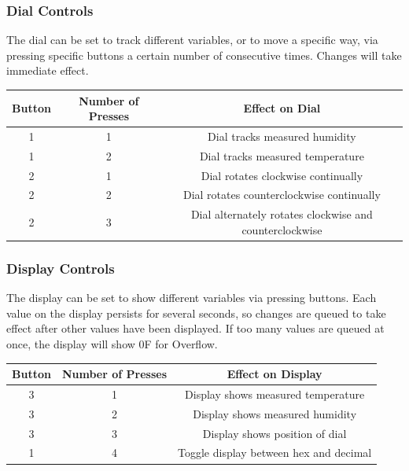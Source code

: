 \documentclass[12pt]{amsart}
\begin{document}
\subsubsection{Dial Controls}

The dial can be set to track different variables, or to move a specific way, via pressing
specific buttons a certain number of consecutive times. Changes will take immediate effect.

\begin{center}
    \begin{tabular}{c|c|c}
        Button & Number of Presses & Effect on Dial \\
        \hline
        1 & 1 & Dial tracks measured humidity \\
        1 & 2 & Dial tracks measured temperature \\
        2 & 1 & Dial rotates clockwise continually \\
        2 & 2 & Dial rotates counterclockwise continually \\
        2 & 3 & Dial alternately rotates clockwise and counterclockwise \\
    \end{tabular}
\end{center}


\subsubsection{Display Controls}

The display can be set to show different variables via pressing buttons. Each value on the
display persists for several seconds, so changes are queued to take effect after other
values have been displayed. If too many values are queued at once, the display will show 0F for
Overflow.

\begin{center}
    \begin{tabular}{c|c|c}
        Button & Number of Presses & Effect on Display \\
        \hline
        3 & 1 & Display shows measured temperature \\
        3 & 2 & Display shows measured humidity \\
        3 & 3 & Display shows position of dial \\
        1 & 4 & Toggle display between hex and decimal \\
    \end{tabular}
\end{center}
\end{document}
